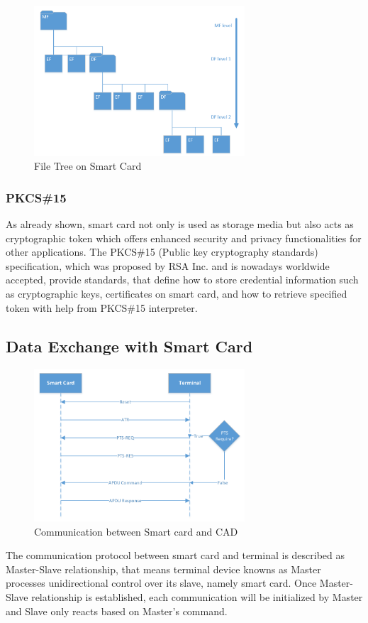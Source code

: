 \begin{figure}[!htbp]
	\centering
	\includegraphics[width=0.7\textwidth]{file-structure}
		\caption{File Tree on Smart Card\cite{handbuch}}
	\label{fig:file-structure}
\end{figure}

\subsubsection{PKCS{\#}15}
As already shown, smart card not only is used as storage media but also acts as cryptographic token which offers enhanced security and privacy functionalities for other applications. The PKCS\#15 (Public key cryptography standards) specification\cite{pkcs}, which was proposed by RSA Inc. and is nowadays worldwide accepted, provide standards, that define how to store credential information such as cryptographic keys, certificates on smart card, and how to retrieve specified token with help from PKCS\#15 interpreter.
 
\subsection{Data Exchange with Smart Card}

\begin{figure}[!htbp]
	\centering
	\includegraphics[width=0.7\textwidth]{master-slave-relationship}
		\caption{Communication between Smart card and CAD\cite{handbuch}}
	\label{fig:master-slave-relationship}
\end{figure}
The communication protocol between smart card and terminal is described as Master-Slave relationship\cite{handbuch}, that means terminal device knowns as Master processes unidirectional control over its slave, namely smart card. Once Master-Slave relationship is established, each communication will be initialized by Master and Slave only reacts based on Master's command. 

